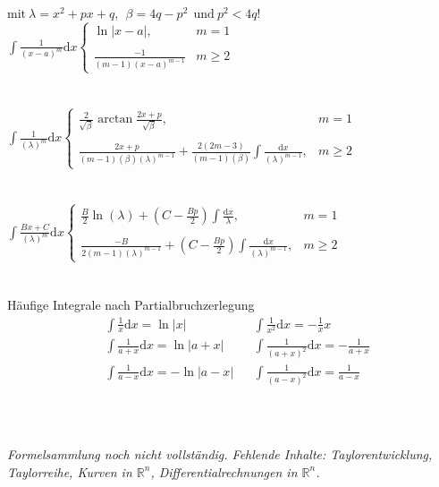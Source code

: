 \documentclass[6pt,a4paper]{scrartcl}
\newcommand{\abs}[1]{\ensuremath{\left\vert#1\right\vert}}
\begin{document}
\begin{multicols*}{4}
$\text{mit} ~ \lambda=x^2+px+q, ~~ \beta=4q-p^2 ~~ \text{und} ~p^2<4q$!
$\int\frac{1}{(x-a)^m}\mathrm dx \begin{cases} \ln\left|x-a\right|, & m=1\\ \\ \frac{-1}{(m-1)(x-a)^{m-1}} &m\geq2 \end{cases}$\\ \\ \\
$\int\frac{1}{(\lambda)^m} \mathrm dx \begin{cases} \frac{2}{\sqrt{\beta}} \arctan\frac{2x+p}{\sqrt{\beta}}, &m=1\\ \\ \frac{2x+p}{(m-1)(\beta)(\lambda)^{m-1}}+\frac{2(2m-3)}{(m-1)(\beta)} \int\frac{\mathrm dx}{(\lambda)^{m-1}}, &m\geq2 \end{cases}$\\ \\ \\
$\int\frac{Bx+C}{(\lambda)^m} \mathrm dx \begin{cases} \frac{B}{2} \ln(\lambda) + (C-\frac{Bp}{2}) \int\frac{\mathrm dx}{\lambda}, &m=1\\ \\ \frac{-B}{2(m-1)(\lambda)^{m-1}} + (C-\frac{Bp}{2}) \int\frac{\mathrm dx}{(\lambda)^{m-1}}, &m\geq2 \end{cases}$\\ \\ \\
Häufige Integrale nach Partialbruchzerlegung
\begin{align*}
&\int\frac{1}{x}\mathrm dx = \ln\abs{x}&&\int\frac{1}{x^2}\mathrm dx = -\frac{1}{x}  x \\
&\int\frac{1}{a+x}\mathrm dx = \ln\abs{a+x} && \int\frac{1}{(a+x)^2}\mathrm dx = -\frac{1}{a+x} \\
&\int\frac{1}{a-x}\mathrm dx = -\ln\abs{a-x} && \int\frac{1}{(a-x)^2}\mathrm dx = \frac{1}{a-x} \\
\end{align*}
\\ \\ \\
\textit{Formelsammlung noch nicht vollständig. Fehlende Inhalte: Taylorentwicklung, Taylorreihe, Kurven in $\mathbb{R}^n$, Differentialrechnungen in $\mathbb{R}^n$.}

\end{multicols*}


\end{document}
